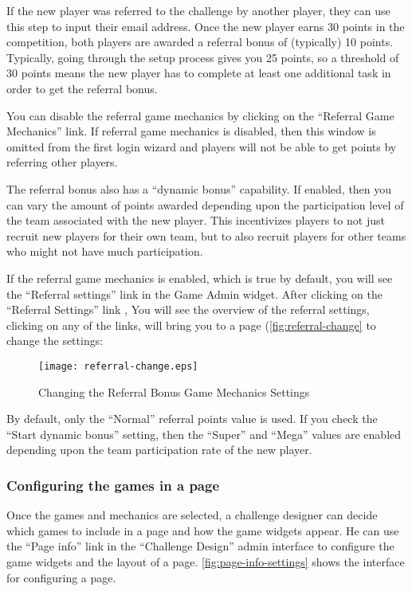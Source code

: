 If the new player was referred to the challenge by another player, they can use this step to input their email address. Once the new player earns 30 points in the competition, both players are awarded a referral bonus of (typically) 10 points. Typically, going through the setup process gives you 25 points, so a threshold of 30 points means the new player has to complete at least one additional task in order to get the referral bonus.

You can disable the referral game mechanics by clicking on the ``Referral Game Mechanics'' link. If referral game mechanics is disabled, then this window is omitted from the first login wizard and players will not be able to get points by referring other players.

The referral bonus also has a ``dynamic bonus'' capability. If enabled, then you can vary the amount of points awarded depending upon the participation level of the team associated with the new player. This incentivizes players to not just recruit new players for their own team, but to also recruit players for other teams who might not have much participation.

If the referral game mechanics is enabled, which is true by default, you will see the ``Referral settings'' link in the Game Admin widget. After clicking on the ``Referral Settings'' link , You will see the overview of the referral settings, clicking on any of the links, will bring you to a page (\autoref{fig:referral-change} to change the settings:

\begin{figure}[!ht]
  \center
  \texttt{[image: referral-change.eps]}
  \caption{Changing the Referral Bonus Game Mechanics Settings}
  \label{fig:referral-change}
\end{figure}

By default, only the ``Normal'' referral points value is used. If you check the ``Start dynamic bonus'' setting, then the ``Super'' and ``Mega'' values are enabled depending upon the team participation rate of the new player.

\subsubsection{Configuring the games in a page}
Once the games and mechanics are selected, a challenge designer can decide which games to include in a page and how the game widgets appear. He can use the ``Page info'' link in the ``Challenge Design'' admin interface to configure the game widgets and the layout of a page.  \autoref{fig:page-info-settings} shows the interface for configuring a page. 

